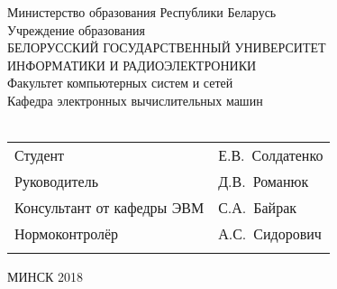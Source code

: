 \begin{titlepage}
  \begin{center}
    Министерство образования Республики Беларусь\\[1em]
    Учреждение образования\\
    БЕЛОРУССКИЙ ГОСУДАРСТВЕННЫЙ УНИВЕРСИТЕТ \\
    ИНФОРМАТИКИ И РАДИОЭЛЕКТРОНИКИ\\[1em]

    Факультет компьютерных систем и сетей \\[0.6cm]

    Кафедра электронных вычислительных машин \\[2.5cm]


        {} \\[4cm]

        \noindent
        \begin{tabular}{ p{}p{} }
          Студент & Е.В.~Солдатенко \\[1em]

          Руководитель & Д.В.~Романюк \\[1em]

          Консультант от кафедры ЭВМ & С.А.~Байрак \\[1em]


          Нормоконтролёр & А.С.~Сидорович\\[1em]
          & \\

        \end{tabular}

        \vfill

        {\normalsize МИНСК 2018}
    \end{center}

\end{titlepage}
